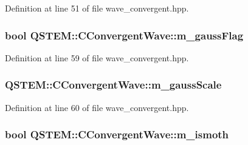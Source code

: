 Definition at line 51 of file wave\-\_\-convergent.\-hpp.

\hypertarget{class_q_s_t_e_m_1_1_c_convergent_wave_aa4b6c3483a0b9836b3f067c8632652ab}{
\subsubsection[{m\-\_\-gauss\-Flag}]{\setlength{\rightskip}{0pt plus 5cm}bool Q\-S\-T\-E\-M\-::\-C\-Convergent\-Wave\-::m\-\_\-gauss\-Flag\hspace{0.3cm}{\ttfamily [protected]}}}\label{class_q_s_t_e_m_1_1_c_convergent_wave_aa4b6c3483a0b9836b3f067c8632652ab}


Definition at line 59 of file wave\-\_\-convergent.\-hpp.

\hypertarget{class_q_s_t_e_m_1_1_c_convergent_wave_a314f397aeb70fec9f09aefd5e5d09d6a}{
\subsubsection[{m\-\_\-gauss\-Scale}]{ Q\-S\-T\-E\-M\-::\-C\-Convergent\-Wave\-::m\-\_\-gauss\-Scale\hspace{0.3cm}{\ttfamily [protected]}}}\label{class_q_s_t_e_m_1_1_c_convergent_wave_a314f397aeb70fec9f09aefd5e5d09d6a}


Definition at line 60 of file wave\-\_\-convergent.\-hpp.

\hypertarget{class_q_s_t_e_m_1_1_c_convergent_wave_a279138d75ec5bceef14b12fe7a4f7642}{
\subsubsection[{m\-\_\-ismoth}]{\setlength{\rightskip}{0pt plus 5cm}bool Q\-S\-T\-E\-M\-::\-C\-Convergent\-Wave\-::m\-\_\-ismoth\hspace{0.3cm}{\ttfamily [protected]}}}\label{class_q_s_t_e_m_1_1_c_convergent_wave_a279138d75ec5bceef14b12fe7a4f7642}


